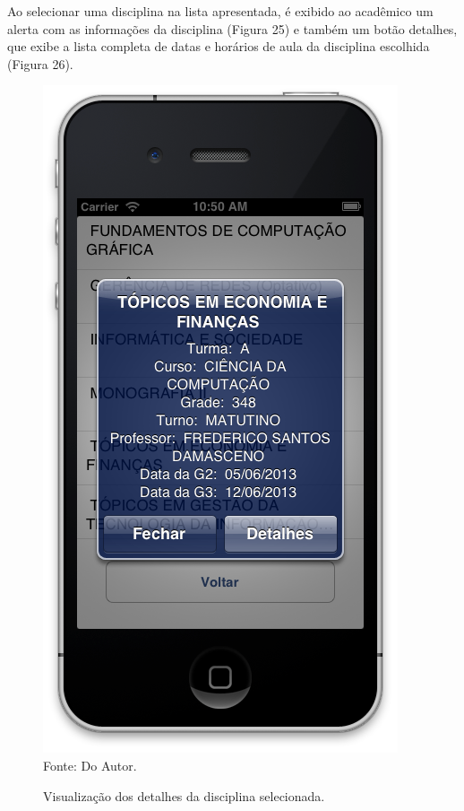 Ao selecionar uma disciplina na lista apresentada, é exibido ao acadêmico um alerta com as informações da disciplina (Figura 25) e também um botão detalhes, que exibe a lista completa de datas e horários de aula da disciplina escolhida (Figura 26).

\begin{figure}[!htb]
     \centering
     \caption[Formulário Horários do Semestre - Visualização de Informações]{Visualização dos detalhes da disciplina selecionada.}
     \includegraphics[scale=0.34]{imagens/formhorariossemestredetalhes.png}
     \\  Fonte: Do Autor.
\end{figure}
